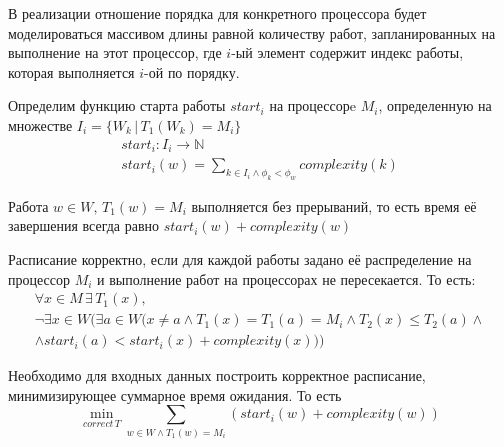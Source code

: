 \documentclass[a4paper,12pt]{article}
\begin{document}
В реализации отношение порядка для конкретного процессора будет
моделироваться массивом длины равной количеству работ,
запланированных на выполнение на этот процессор, где $i$-ый элемент содержит индекс
работы, которая выполняется $i$-ой по порядку.

Определим функцию старта работы $start_i$ на процессорe $M_i$, определенную на
множестве $I_i = \{W_k \, | \, T_1(W_k) = M_i\}$
\begin{gather*}
    start_i : I_i \rightarrow \mathbb{N} \\
    start_i(w) = \sum_{k \in I_i \wedge \phi_k < \phi_w}complexity(k)
\end{gather*}

Работа $w \in W, \, T_1(w) = M_i$ выполняется без прерываний,
то есть время её завершения всегда равно $start_i(w) + complexity(w)$

Расписание корректно, если для каждой работы задано её распределение на процессор $M_i$ и
выполнение работ на процессорах не пересекается. То есть:
\begin{gather*}
    \forall x \in M \, \exists \, T_1(x),\\
    \neg \exists x \in W (\exists a \in W (x \neq a \wedge T_1(x) = T_1(a) = M_i
    \wedge T_2(x) \leq T_2(a) \wedge \\
    \wedge start_i(a) < start_i(x)+complexity(x)))
\end{gather*}

Необходимо для входных данных построить корректное расписание, минимизирующее суммарное время ожидания.
То есть
\[\min_{correct \, T} \sum_{w \in W \wedge T_1(w)=M_i} (start_i(w)+complexity(w))\]
\end{document}
